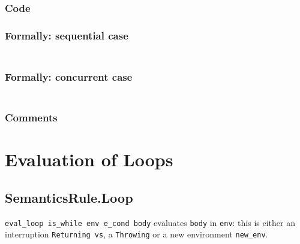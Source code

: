 \documentclass{book}
\begin{document}
    \subsection{Code}

  \subsection{Formally: sequential case}
  \begin{align}
  \end{align} 

  \subsection{Formally: concurrent case}
  \begin{align}
  \end{align} 


    \subsection{Comments}

\chapter{Evaluation of Loops \label{chap:eval_loops}}

\section{SemanticsRule.Loop \label{sec:SemanticsRule.Loop}}
\texttt{eval\_loop is\_while env e\_cond body} evaluates \texttt{body} in
\texttt{env}: this is either an interruption \texttt{Returning vs}, a
\texttt{Throwing} or a new environment \texttt{new\_env}.
\end{document}
